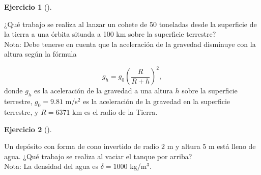 \documentclass[
  spanish,
  a4paper,
]{scrreport}
\theoremstyle{definition}
\newtheorem{exercise}{Ejercicio}[chapter]
\theoremstyle{remark}
\begin{document}
\begin{exercise}[]\protect\hypertarget{exr-trabajo-cohete}{}\label{exr-trabajo-cohete}

¿Qué trabajo se realiza al lanzar un cohete de 50 toneladas desde la
superficie de la tierra a una órbita situada a 100 km sobre la
superficie terrestre?\\
Nota: Debe tenerse en cuenta que la aceleración de la gravedad disminuye
con la altura según la fórmula

\[
g_h = g_0 \left(\frac{R}{R+h}\right)^2,
\] donde \(g_h\) es la aceleración de la gravedad a una altura \(h\)
sobre la superficie terrestre, \(g_0=9.81\) m/s\(^2\) es la aceleración
de la gravedad en la superficie terrestre, y \(R=6371\) km es el radio
de la Tierra.

\end{exercise}

\begin{tcolorbox}[enhanced jigsaw, arc=.35mm, bottomrule=.15mm, bottomtitle=1mm, breakable, colback=white, colbacktitle=quarto-callout-tip-color!10!white, colframe=quarto-callout-tip-color-frame, coltitle=black, left=2mm, leftrule=.75mm, opacityback=0, opacitybacktitle=0.6, rightrule=.15mm, title=\textcolor{quarto-callout-tip-color}{\faLightbulb}\hspace{0.5em}{Solución}, titlerule=0mm, toprule=.15mm, toptitle=1mm]

\end{tcolorbox}

\begin{exercise}[]\protect\hypertarget{exr-trabajo-deposito}{}\label{exr-trabajo-deposito}

Un depósito con forma de cono invertido de radio \(2\) m y altura \(5\)
m está lleno de agua. ¿Qué trabajo se realiza al vaciar el tanque por
arriba?\\
Nota: La densidad del agua es \(\delta = 1000\) kg/m\(^3\).

\end{exercise}
\end{document}
